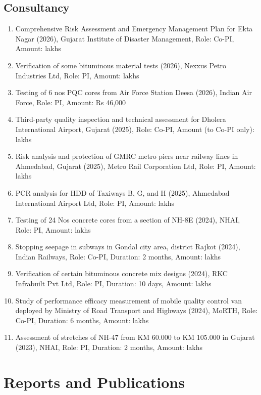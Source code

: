 \documentclass[12pt]{article}
\begin{document}
\subsection*{Consultancy}
\begin{enumerate}
	\item Comprehensive Risk Assessment and Emergency Management Plan for Ekta Nagar (2026), Gujarat Institute of Disaster Management, Role: Co-PI, Amount:  lakhs
	\item Verification of some bituminous material tests (2026), Nexxus Petro Industries Ltd, Role: PI, Amount:  lakhs
	\item Testing of 6 nos PQC cores from Air Force Station Deesa (2026), Indian Air Force, Role: PI, Amount: Rs 46,000
	\item Third-party quality inspection and technical assessment for Dholera International Airport, Gujarat (2025), Role: Co-PI, Amount (to Co-PI only):  lakhs
	\item Risk analysis and protection of GMRC metro piers near railway lines in Ahmedabad, Gujarat (2025), Metro Rail Corporation Ltd, Role: PI, Amount:  lakhs
	\item PCR analysis for HDD of Taxiways B, G, and H (2025), Ahmedabad International Airport Ltd, Role: PI, Amount:  lakhs
	\item Testing of 24 Nos concrete cores from a section of NH-8E (2024), NHAI, Role: PI, Amount:  lakhs
	\item Stopping seepage in subways in Gondal city area, district Rajkot (2024), Indian Railways, Role: Co-PI, Duration: 2 months, Amount:  lakhs
	\item Verification of certain bituminous concrete mix designs (2024), RKC Infrabuilt Pvt Ltd, Role: PI, Duration: 10 days, Amount:  lakhs
	\item Study of performance efficacy measurement of mobile quality control van deployed by Ministry of Road Transport and Highways (2024), MoRTH, Role: Co-PI, Duration: 6 months, Amount:  lakhs
	\item Assessment of stretches of NH-47 from KM 60.000 to KM 105.000 in Gujarat (2023), NHAI, Role: PI, Duration: 2 months, Amount:  lakhs
\end{enumerate}


\bigskip
\section*{Reports and Publications}
\hfill
\end{document}
